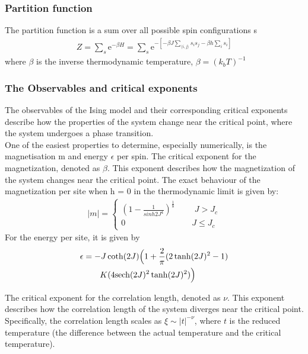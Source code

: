 \documentclass[%
reprint,
 amsmath,amssymb,
 aps,
]{revtex4-2}
\begin{document}
\subsubsection{Partition function}
The partition function is a sum over all possible spin configurations s
\begin{align}
    Z = \sum_{s} \mathrm{e}^{-\beta H} = \sum_{s} \mathrm{e}^{-[-\beta J \sum_{\langle i,j \rangle}s_i s_j - \beta h \sum_{i}s_i]}
\end{align}
where $\beta$ is the inverse thermodynamic temperature, $\beta = (k_{b}T)^{-1}$


\subsubsection{The Observables and critical exponents}\label{section:crit_expo}
The observables of the Ising model and their corresponding critical exponents\cite{PhysicsPhysiqueFizika.2.263} describe how the properties of the system change near the critical point, where the system undergoes a phase transition. \\
One of the easiest properties to determine, especially numerically, is the magnetisation m and energy $\epsilon$ per spin. The critical exponent for the magnetization, denoted as $\beta$. This exponent describes how the magnetization of the system changes near the critical point. 
The exact behaviour of the magnetization per site when h = 0 in the thermodynamic limit is given by: 
\begin{align}
    |m| = 
    \begin{cases}
    (1 - \frac{1}{sinh{2J}^{4}})^{\frac{1}{8}} \,\, \qquad J > J_c \\
    0 \qquad \qquad \qquad \qquad J \leq J_c
    \end{cases}
\end{align}
For the energy per site, it is given by
\begin{align}
    \epsilon &= -J \coth(2J)\Bigl(1+\frac{2}{\pi}(2\tanh(2J)^{2}-1) \notag \\
    & \qquad K(4 \mathrm{sech}(2J)^{2}\tanh(2J)^{2})\Bigr) 
\end{align}

The critical exponent for the correlation length, denoted as $\nu$. This exponent describes how the correlation length of the system diverges near the critical point. Specifically, the correlation length scales as $\xi \sim |t|^{-\nu}$, where $t$ is the reduced temperature (the difference between the actual temperature and the critical temperature).
\end{document}
